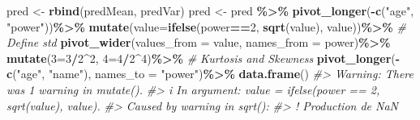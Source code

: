 \documentclass[
]{article}
\newenvironment{Shaded}{\begin{snugshade}}{\end{snugshade}}
\newcommand{\AttributeTok}[1]{\textcolor[rgb]{0.13,0.29,0.53}{#1}}
\newcommand{\CommentTok}[1]{\textcolor[rgb]{0.56,0.35,0.01}{\textit{#1}}}
\newcommand{\DecValTok}[1]{\textcolor[rgb]{0.00,0.00,0.81}{#1}}
\newcommand{\FunctionTok}[1]{\textcolor[rgb]{0.13,0.29,0.53}{\textbf{#1}}}
\newcommand{\NormalTok}[1]{#1}
\newcommand{\OtherTok}[1]{\textcolor[rgb]{0.56,0.35,0.01}{#1}}
\newcommand{\SpecialCharTok}[1]{\textcolor[rgb]{0.81,0.36,0.00}{\textbf{#1}}}
\newcommand{\StringTok}[1]{\textcolor[rgb]{0.31,0.60,0.02}{#1}}
\begin{document}
\begin{Shaded}
\begin{Highlighting}[]
\NormalTok{pred }\OtherTok{\textless{}{-}} \FunctionTok{rbind}\NormalTok{(predMean, predVar)}
\NormalTok{pred }\OtherTok{\textless{}{-}}\NormalTok{ pred }\SpecialCharTok{\%\textgreater{}\%}
  \FunctionTok{pivot\_longer}\NormalTok{(}\SpecialCharTok{{-}}\FunctionTok{c}\NormalTok{(}\StringTok{"age"}\NormalTok{, }\StringTok{"power"}\NormalTok{))}\SpecialCharTok{\%\textgreater{}\%}
  \FunctionTok{mutate}\NormalTok{(}\AttributeTok{value=}\FunctionTok{ifelse}\NormalTok{(power}\SpecialCharTok{==}\DecValTok{2}\NormalTok{, }\FunctionTok{sqrt}\NormalTok{(value), value))}\SpecialCharTok{\%\textgreater{}\%} \CommentTok{\# Define std}
  \FunctionTok{pivot\_wider}\NormalTok{(}\AttributeTok{values\_from =}\NormalTok{ value,}
              \AttributeTok{names\_from =}\NormalTok{ power)}\SpecialCharTok{\%\textgreater{}\%}
  \FunctionTok{mutate}\NormalTok{(}\StringTok{\textasciigrave{}}\AttributeTok{3}\StringTok{\textasciigrave{}}\OtherTok{=}\StringTok{\textasciigrave{}}\AttributeTok{3}\StringTok{\textasciigrave{}}\SpecialCharTok{/}\StringTok{\textasciigrave{}}\AttributeTok{2}\StringTok{\textasciigrave{}}\SpecialCharTok{\^{}}\DecValTok{2}\NormalTok{,}
         \StringTok{\textasciigrave{}}\AttributeTok{4}\StringTok{\textasciigrave{}}\OtherTok{=}\StringTok{\textasciigrave{}}\AttributeTok{4}\StringTok{\textasciigrave{}}\SpecialCharTok{/}\StringTok{\textasciigrave{}}\AttributeTok{2}\StringTok{\textasciigrave{}}\SpecialCharTok{\^{}}\DecValTok{4}\NormalTok{)}\SpecialCharTok{\%\textgreater{}\%} \CommentTok{\# Kurtosis and Skewness}
  \FunctionTok{pivot\_longer}\NormalTok{(}\SpecialCharTok{{-}}\FunctionTok{c}\NormalTok{(}\StringTok{"age"}\NormalTok{, }\StringTok{"name"}\NormalTok{), }\AttributeTok{names\_to =} \StringTok{"power"}\NormalTok{)}\SpecialCharTok{\%\textgreater{}\%}
  \FunctionTok{data.frame}\NormalTok{()}
\CommentTok{\#\textgreater{} Warning: There was 1 warning in \textasciigrave{}mutate()\textasciigrave{}.}
\CommentTok{\#\textgreater{} i In argument: \textasciigrave{}value = ifelse(power == 2, sqrt(value), value)\textasciigrave{}.}
\CommentTok{\#\textgreater{} Caused by warning in \textasciigrave{}sqrt()\textasciigrave{}:}
\CommentTok{\#\textgreater{} ! Production de NaN}


\end{Highlighting}
\end{Shaded}
\end{document}
